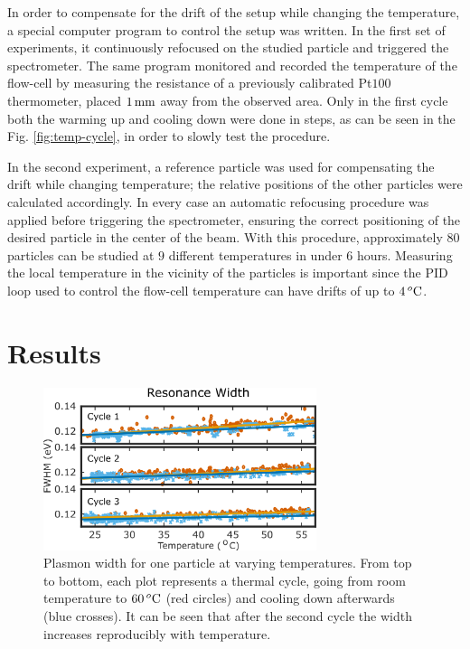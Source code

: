 In order to compensate for the drift of the setup while changing the
temperature, a special computer program to control the setup was written. In the
first set of experiments, it continuously refocused on the studied particle and
triggered the spectrometer. The same program monitored and recorded the
temperature of the flow-cell by measuring the resistance of a previously
calibrated Pt$100$ thermometer, placed $1\,\textrm{mm}$ away from the observed area. Only
in the first cycle both the warming up and cooling down were done in steps, as
can be seen in the Fig. \ref{fig:temp-cycle}, in order to slowly test the
procedure.

In the second experiment, a reference particle was used for compensating the
drift while changing temperature; the relative positions of the other particles
were calculated accordingly. In every case an automatic refocusing procedure was
applied before triggering the spectrometer, ensuring the correct positioning of
the desired particle in the center of the beam. With this procedure,
approximately $80$ particles can be studied at $9$ different temperatures in
under $6$ hours. Measuring the local temperature in the vicinity of the
particles is important since the PID loop used to control the flow-cell
temperature can have drifts of up to $4\,^o\textrm{C}$.

\section{Results}
\begin{figure}[tp] \centering
\includegraphics[width=80mm]{Chapters/05_WhiteLight/Figures/02_One_Pcle/02_One_Pcle.png}
\caption{Plasmon width for one particle at varying temperatures. From top to
bottom, each plot represents a thermal cycle, going from room temperature to
$60\,^o\textrm{C}$ (red circles) and cooling down afterwards (blue crosses). It can be
seen that after the second cycle the width increases reproducibly with
temperature.}
	\label{fig:one_pcle}
\end{figure}

